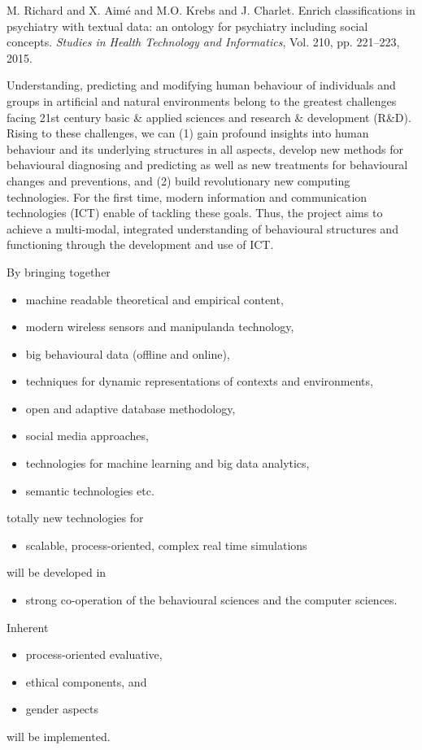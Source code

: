 \documentclass[a4paper,USenglish]{dagrep}
\begin{document}
\begin{thebibliography}{0}
M. Richard and X. Aim\'{e} and M.O. Krebs and J.
Charlet.  Enrich classifications in psychiatry with textual
data: an ontology for psychiatry including social concepts.  \textit{Studies in {H}ealth {T}echnology and {I}nformatics}, Vol. 210, pp. 221--223, 2015.
\end{thebibliography}


{}
\license
Understanding, predicting and modifying human behaviour of individuals and
groups in artificial and natural environments belong to the greatest challenges
facing 21st century basic \& applied sciences and research \& development
(R\&D). Rising to these challenges, we can (1) gain profound insights into human
behaviour and its underlying structures in all aspects, develop new methods for
behavioural diagnosing and predicting as well as new treatments for behavioural
changes and preventions, and (2) build revolutionary new computing technologies.
For the first time, modern information and communication technologies (ICT)
enable of tackling these goals. Thus, the project aims to achieve a multi-modal,
integrated understanding of behavioural structures and functioning through the
development and use of ICT. 

By bringing together
\begin{itemize}
\item machine readable theoretical and empirical content,
\item modern wireless sensors and manipulanda technology,
\item big behavioural data (offline and online),
\item techniques for dynamic representations of contexts and environments,
\item open and adaptive database methodology,
\item social media approaches,
\item technologies for machine learning and big data analytics,
\item semantic technologies etc.
\end{itemize}
totally new technologies for
\begin{itemize}
\item scalable, process-oriented, complex real time simulations
\end{itemize}
will be developed in
\begin{itemize}
\item strong co-operation of the behavioural sciences and the computer sciences.
\end{itemize}
Inherent
\begin{itemize}
\item process-oriented evaluative,
\item ethical components, and
\item gender aspects
\end{itemize}
will be implemented.
\end{document}
